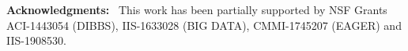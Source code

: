 \documentclass{svproc}
\begin{document}









\smallskip

\noindent
\textbf{Acknowledgments:}~
This work has been partially supported by
NSF Grants  ACI-1443054 (DIBBS), 
IIS-1633028 (BIG DATA),
CMMI-1745207 (EAGER) and
IIS-1908530.




\end{document}

